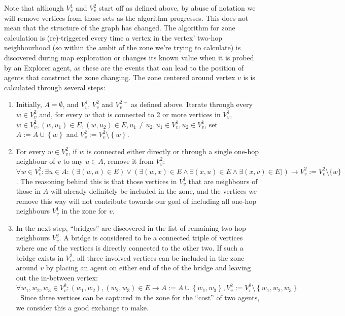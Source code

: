 Note that although $V_v^1$ and $V_v^2$ start off as defined above, by abuse of notation we will remove vertices from those sets as the algorithm progresses.
This does not mean that the structure of the graph has changed.
The algorithm for zone calculation is (re)-triggered every time a vertex in the vertex' two-hop neighbourhood (so within the ambit of the zone we're trying to calculate) is discovered during map exploration or changes its known value when it is probed by an Explorer agent, as these are the events that can lead to the position of agents that construct the zone changing.
The zone centered around vertex $v$ is is calculated through several steps:
\begin{enumerate}
  \item Initially, $A = \emptyset$, and $V_v^1$, $V_v^2$ and $V_v^{2+}$ as defined above.
        Iterate through every $w \in V_v^2$ and, for every $w$ that is connected to 2 or more vertices in $V_v^1$, $w \in V_v^2, \left(w, u_1 \right )\in E, \left(w, u_2 \right ) \in E, u_1 \neq u_2, u_1 \in V_v^1, u_2 \in V_v^1$, set $A := A \cup \left\{w\right\}$ and $V_v^2 := V_v^2 \setminus \left\{w \right \}$.
  \item For every $w \in V_v^2$, if $w$ is connected either directly or through a single one-hop neighbour of $v$ to any $u \in A$, remove it from $V_v^2$: $\forall w \in V_v^2: \exists u \in A: \left(\exists \left(w, u \right ) \in E \right ) \vee \left(\exists \left(w, x\right)\in E \wedge \exists \left(x, u\right) \in E \wedge \exists (x, v) \in E ) \right ) \rightarrow V_v^2 := V_v^2 \setminus \{w\}$.
      The reasoning behind this is that those vertices in $V_v^1$ that are neighbours of those in $A$ will already definitely be included in the zone, and the vertices we remove this way will not contribute towards our goal of including all one-hop neighbours $V_v^1$ in the zone for $v$.
  \item In the next step, \enquote{bridges} are discovered in the list of remaining two-hop neighbours $V_v^2$.
        A bridge is considered to be a connected triple of vertices where one of the vertices is directly connected to the other two.
        If such a bridge exists in $V_v^2$, all three involved vertices can be included in the zone around $v$ by placing an agent on either end of the of the bridge and leaving out the in-between vertex: $\forall w_1, w_2, w_3 \in V_v^2: \left(w_1, w_2\right ), \left(w_2, w_3 \right ) \in E \rightarrow A := A \cup \left\{w_1, w_3 \right \}, V_v^2 := V_v^2 \setminus \left\{w_1,w_2,w_3\right\}$.
        Since three vertices can be captured in the zone for the \enquote{cost} of two agents, we consider this a good exchange to make.

\end{enumerate}
